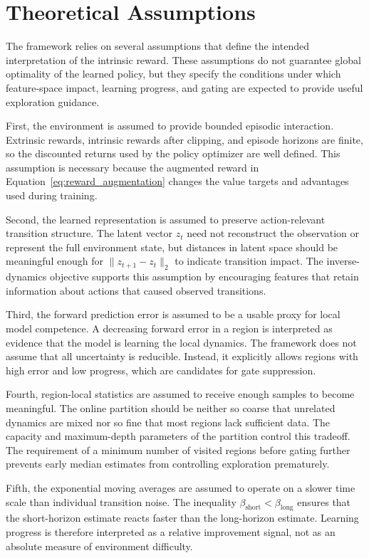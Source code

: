 \section{Theoretical Assumptions}
\label{sec:theoretical_assumptions}

The framework relies on several assumptions that define the intended interpretation of the intrinsic reward.
These assumptions do not guarantee global optimality of the learned policy, but they specify the conditions under which feature-space impact, learning progress, and gating are expected to provide useful exploration guidance.

First, the environment is assumed to provide bounded episodic interaction.
Extrinsic rewards, intrinsic rewards after clipping, and episode horizons are finite, so the discounted returns used by the policy optimizer are well defined.
This assumption is necessary because the augmented reward in Equation~\ref{eq:reward_augmentation} changes the value targets and advantages used during training.

Second, the learned representation is assumed to preserve action-relevant transition structure.
The latent vector $z_t$ need not reconstruct the observation or represent the full environment state, but distances in latent space should be meaningful enough for $\lVert z_{t+1}-z_t\rVert_2$ to indicate transition impact.
The inverse-dynamics objective supports this assumption by encouraging features that retain information about actions that caused observed transitions.

Third, the forward prediction error is assumed to be a usable proxy for local model competence.
A decreasing forward error in a region is interpreted as evidence that the model is learning the local dynamics.
The framework does not assume that all uncertainty is reducible.
Instead, it explicitly allows regions with high error and low progress, which are candidates for gate suppression.

Fourth, region-local statistics are assumed to receive enough samples to become meaningful.
The online partition should be neither so coarse that unrelated dynamics are mixed nor so fine that most regions lack sufficient data.
The capacity and maximum-depth parameters of the partition control this tradeoff.
The requirement of a minimum number of visited regions before gating further prevents early median estimates from controlling exploration prematurely.

Fifth, the exponential moving averages are assumed to operate on a slower time scale than individual transition noise.
The inequality $\beta_{\mathrm{short}}<\beta_{\mathrm{long}}$ ensures that the short-horizon estimate reacts faster than the long-horizon estimate.
Learning progress is therefore interpreted as a relative improvement signal, not as an absolute measure of environment difficulty.

